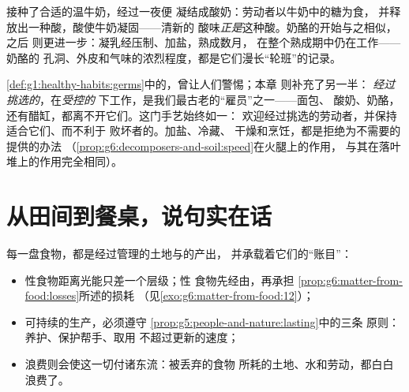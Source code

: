 \begin{example}[牛奶变成酸奶和奶酪]\label{ex:g6:producing-our-food:yogurt}
接种了合适的温牛奶，经过一夜便
凝结成酸奶：劳动者以牛奶中的糖为食，
并释放出一种酸，酸使牛奶凝固——清新的
酸味\emph{正是}这种酸。奶酪的开始与之相似，之后
则更进一步：凝乳经压制、加盐，熟成数月，
在整个熟成期中仍在工作——奶酪的
孔洞、外皮和气味的浓烈程度，都是它们漫长“轮班”的记录。
\end{example}

\begin{remark}[有益与有害的微生物]\label{rem:g6:producing-our-food:goodbad}
\cref{def:g1:healthy-habits:germs}中的，曾让人们警惕；本章
则补充了另一半：
\emph{经过挑选的}，在\emph{受控的}
下工作，是我们最古老的“雇员”之一——面包、
酸奶、奶酪，还有醋缸，都离不开它们。这门手艺始终如一：
欢迎经过挑选的劳动者，并保持适合它们、而不利于
败坏者的。加盐、冷藏、
干燥和烹饪，都是拒绝为不需要的提供的办法
（\cref{prop:g6:decomposers-and-soil:speed}在火腿上的作用，
与其在落叶堆上的作用完全相同）。
\end{remark}

\section{从田间到餐桌，说句实在话}

\begin{proposition}[餐桌上的代价]\label{prop:g6:producing-our-food:costs}
每一盘食物，都是经过管理的土地与的产出，
并承载着它们的“账目”：
\begin{itemize}
  \item {}性食物距离光能只差一个层级；性
        食物先经由，再承担
        \cref{prop:g6:matter-from-food:losses}所述的损耗
        （见\cref{exo:g6:matter-from-food:12}）；
  \item 可持续的生产，必须遵守
        \cref{prop:g5:people-and-nature:lasting}中的三条
        原则：养护、保护帮手、取用
        不超过更新的速度；
  \item 浪费则会使这一切付诸东流：被丢弃的食物
        所耗的土地、水和劳动，都白白浪费了。
\end{itemize}
\end{proposition}
\admitted

